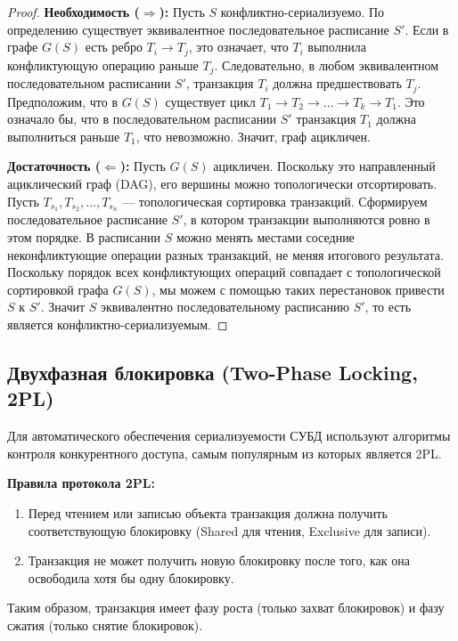\documentclass[a4paper,12pt]{article}
\begin{document}
\begin{proof}
\textbf{Необходимость ($\Rightarrow$):} Пусть $S$ конфликтно-сериализуемо. По определению существует эквивалентное последовательное расписание $S'$. Если в графе $G(S)$ есть ребро $T_i \to T_j$, это означает, что $T_i$ выполнила конфликтующую операцию раньше $T_j$. Следовательно, в любом эквивалентном последовательном расписании $S'$, транзакция $T_i$ должна предшествовать $T_j$. Предположим, что в $G(S)$ существует цикл $T_1 \to T_2 \to \dots \to T_k \to T_1$. Это означало бы, что в последовательном расписании $S'$ транзакция $T_1$ должна выполниться раньше $T_1$, что невозможно. Значит, граф ацикличен.

\textbf{Достаточность ($\Leftarrow$):} Пусть $G(S)$ ацикличен. Поскольку это направленный ациклический граф (DAG), его вершины можно топологически отсортировать. Пусть $T_{s_1}, T_{s_2}, \dots, T_{s_n}$ — топологическая сортировка транзакций. Сформируем последовательное расписание $S'$, в котором транзакции выполняются ровно в этом порядке. В расписании $S$ можно менять местами соседние неконфликтующие операции разных транзакций, не меняя итогового результата. Поскольку порядок всех конфликтующих операций совпадает с топологической сортировкой графа $G(S)$, мы можем с помощью таких перестановок привести $S$ к $S'$. Значит $S$ эквивалентно последовательному расписанию $S'$, то есть является конфликтно-сериализуемым.
\end{proof}

\subsection{Двухфазная блокировка (Two-Phase Locking, 2PL)}

Для автоматического обеспечения сериализуемости СУБД используют алгоритмы контроля конкурентного доступа, самым популярным из которых является 2PL.

\textbf{Правила протокола 2PL:}
\begin{enumerate}
    \item Перед чтением или записью объекта транзакция должна получить соответствующую блокировку (Shared для чтения, Exclusive для записи).
    \item Транзакция не может получить новую блокировку после того, как она освободила хотя бы одну блокировку.
\end{enumerate}

Таким образом, транзакция имеет фазу роста (только захват блокировок) и фазу сжатия (только снятие блокировок).
\end{document}
